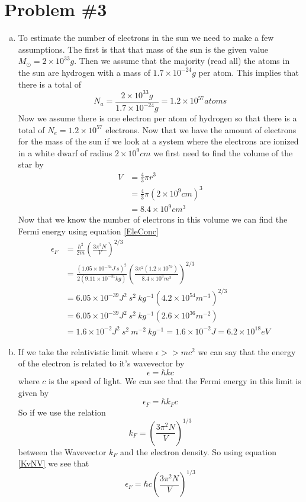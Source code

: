 \documentclass[11pt]{article}
\numberwithin{equation}{section}
\begin{document}
\section{Problem \#3}
\begin{enumerate}[(a)]
\item
To estimate the number of electrons in the sun we need to make a few assumptions. The first is that that mass of the sun is the given value $M_{\odot} = 2\times10^{33}\unit{g}$. Then we assume that the majority (read all) the atoms in the sun are hydrogen with a mass of $1.7\times10^{-24}\unit{g}$ per atom. This implies that there is a total of 
$$N_a = \frac{2\times10^{33}\unit{g}}{1.7\times10^{-24}\unit{g}} = 1.2\times10^{57}\unit{atoms}$$
Now we assume there is one electron per atom of hydrogen so that there is a total of $N_e = 1.2\times10^{57}$ electrons. Now that we have the amount of electrons for the mass of the sun if we look at a system where the electrons are ionized in a white dwarf of radius $2\times10^{9}\unit{cm}$ we first need to find the volume of the star by
\begin{align*}
V &= \frac{4}{3}\pi r^3\\
&= \frac{4}{3}\pi (2\times10^{9}\unit{cm})^3\\
&= 8.4\times10^{9}\unit{cm^3}
\end{align*}
Now that we know the number of electrons in this volume we can find the Fermi energy using equation \ref{EleConc}
\begin{align*}
\epsilon_F &= \frac{\hbar^2}{2m}\left(\frac{3\pi^2N}{V}\right)^{2/3}\\
&= \frac{(1.05\times10^{-34}\unit{J\ s})^2}{2(9.11\times10^{-31}\unit{kg})}\left(\frac{3\pi^2(1.2\times10^{57})}{8.4\times10^{3}\unit{m^3}}\right)^{2/3}\\
&= 6.05\times10^{-39}\unit{J^2\ s^2\ kg^{-1}} \left(4.2\times10^{54}\unit{m^{-3}}\right)^{2/3}\\
&= 6.05\times10^{-39}\unit{J^2\ s^2\ kg^{-1}} \left(2.6\times10^{36}\unit{m^{-2}}\right)\\
&= 1.6\times10^{-2}\unit{J^2\ s^2\ m^{-2}\ kg^{-1}} = 1.6\times10^{-2}\unit{J} =6.2\times10^{18}\unit{eV}
\end{align*}

\item
If we take the relativistic limit where $\epsilon >> mc^2$ we can say that the energy of the electron is related to it's wavevector by
$$\epsilon = \hbar kc$$
where $c$ is the speed of light. We can see that the Fermi energy in this limit is given by
$$\epsilon_F = \hbar k_F c$$
So if we use the relation
\begin{equation}
k_F = \left(\frac{3\pi^2N}{V}\right)^{1/3}
\label{KvNV}
\end{equation}
between the Wavevector $k_F$ and the electron density. So using equation \ref{KvNV} we see that
\begin{equation}
\epsilon_F = \hbar c \left(\frac{3\pi^2N}{V}\right)^{1/3}
\label{partb}
\end{equation}


\end{enumerate}
\end{document}
